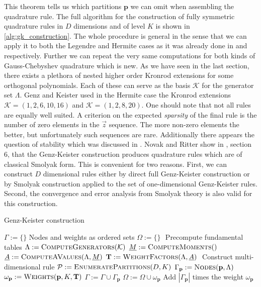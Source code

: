 \documentclass[a4paper,10pt]{article}
\begin{document}
This theorem tells us which partitions $\mathbf{p}$ we can omit when assembling
the quadrature rule. The full algorithm for the construction of fully symmetric quadrature
rules in $D$ dimensions and of level $K$ is shown in \ref{alg:gk_construction}.
The whole procedure is general in the sense that we can apply it to both the Legendre and
Hermite cases as it was already done in \cite{genz} and \cite{genz_keister} respectively.
Further we can repeat the very same computations for both kinds of Gauss-Chebyshev
quadrature which is new. As we have seen in the last section, there exists a plethora
of nested higher order Kronrod extensions for some orthogonal polynomials. Each of these
can serve as the basis $\mathcal{K}$ for the generator set $\Lambda$. Genz and Keister used in
the Hermite case the Kronrod extensions $\mathcal{K} = (1, 2, 6, 10, 16)$ and $\mathcal{K} = (1, 2, 8, 20)$.
One should note that not all rules are equally well suited. A criterion on the expected
\emph{sparsity} of the final rule is the number of zero elements in the $\vec{z}$ sequence.
The more non-zero elements the better, but unfortunately such sequences are rare.
Additionally there appears the question of stability which was discussed in \cite{genz}.
Novak and Ritter show in \cite{novak_ritter}, section 6, that the Genz-Keister construction
produces quadrature rules which are of classical Smolyak form. This is convenient
for two reasons. First, we can construct $D$ dimensional rules either by direct full
Genz-Keister construction or by Smolyak construction applied to the set of one-dimensional
Genz-Keister rules. Second, the convergence and error analysis from Smolyak theory is
also valid for this construction.

\begin{algorithm}[h!]
  \caption{Genz-Keister construction}
  \label{alg:gk_construction}
  \begin{algorithmic}
      \State $\Gamma := \{\}$
      \Comment Nodes and weights as ordered sets
      \State $\Omega := \{\}$
      \State $ $
      \Comment Precompute fundamental tables
      \State $\Lambda := \textsc{ComputeGenerators}(\mathcal{K})$
      \State $\vec{M} := \textsc{ComputeMoments}()$
      \State $\vec{A} := \textsc{ComputeAValues}(\Lambda, \vec{M})$
      \State $\mat{T} := \textsc{WeightFactors}(\Lambda, \vec{A})$
      \State $ $
      \Comment Construct multi-dimensional rule
      \State $\mathcal{P} := \textsc{EnumeratePartitions}(D, K)$
          \State $\Gamma_\mathbf{p} := \textsc{Nodes}(\mathbf{p}, \Lambda)$
          \State $\omega_\mathbf{p} := \textsc{Weights}(\mathbf{p}, K, \mat{T})$
          \State $\Gamma := \Gamma \cup \Gamma_\mathbf{p}$
          \State $\Omega := \Omega \cup \omega_\mathbf{p}$
          \Comment Add $|\Gamma_\mathbf{p}|$ times the weight $\omega_\mathbf{p}$
        \EndIf
      \EndFor
    \EndProcedure
  \end{algorithmic}
\end{algorithm}
\end{document}
